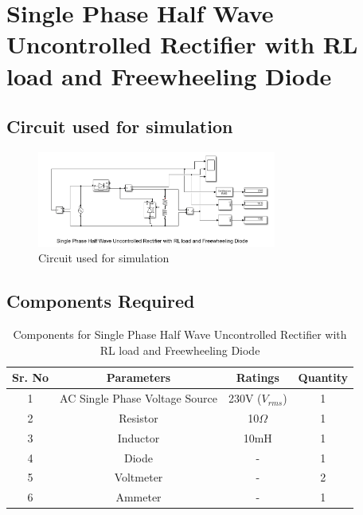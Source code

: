 \section{Single Phase Half Wave Uncontrolled Rectifier with RL load and Freewheeling Diode}

\subsection{Circuit used for simulation}

\begin{figure}[h]
    \centering
    \includegraphics[width=0.7\textwidth]{images/experiment-1/circuit-diagram-simulation-03.png}
    \caption{Circuit used for simulation}
    \label{Fig_simulation_circuit_single-phase-half-wave-uncontrolled-rectifier-with-RL-load-and-freewheeling-diode}
\end{figure}

\subsection{Components Required}

\begin{table}[h]
    \renewcommand{\arraystretch}{1.3}
    \label{table_components_required_circuit_3}
    \centering
    \begin{tabular}{|c|c|c|c|}
        \hline
        Sr. No & Parameters                     & Ratings            & Quantity \\
        \hline
        \hline
        1      & AC Single Phase Voltage Source & 230V ($ V_{rms} $) & 1        \\
        \hline
        2      & Resistor                       & 10$ \Omega $       & 1        \\
        \hline
        3      & Inductor                       & 10mH               & 1        \\
        \hline
        4      & Diode                          & -                  & 1        \\
        \hline
        5      & Voltmeter                      & -                  & 2        \\
        \hline
        6      & Ammeter                        & -                  & 1        \\
        \hline
    \end{tabular}
    \caption{Components for Single Phase Half Wave Uncontrolled Rectifier with RL load and Freewheeling Diode}
\end{table}


